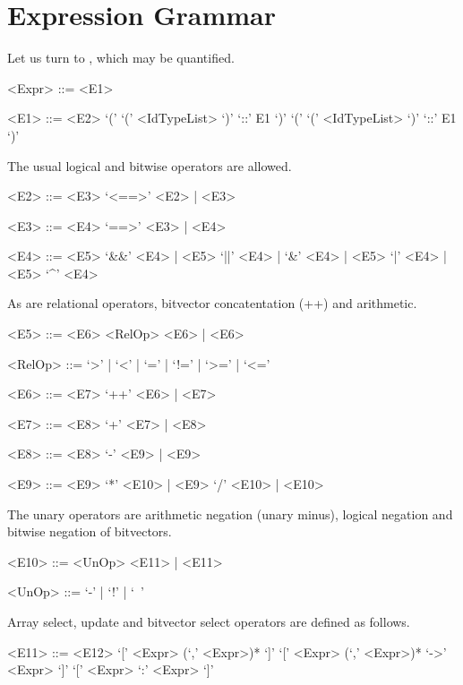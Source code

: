 \section{Expression Grammar}
Let us turn to , which may be quantified. 
\begin{grammar}
    <Expr> ::= <E1>

    <E1> ::= <E2>
         \alt `('  `(' <IdTypeList> `)' `::' E1 `)'
         \alt `('  `(' <IdTypeList> `)' `::' E1 `)'

\end{grammar}

The usual logical and bitwise operators are allowed.
\begin{grammar}
    <E2> ::= <E3> `<==>' <E2> | <E3>

    <E3> ::= <E4> `==>' <E3> | <E4>

    <E4> ::=  <E5> `&&' <E4> | <E5> `||' <E4> | 
          `&' <E4> | <E5> `|' <E4> | <E5> `^' <E4> 
\end{grammar}

As are relational operators, bitvector concatentation (++) and arithmetic.

\begin{grammar}
<E5> ::=  <E6> <RelOp> <E6> | <E6>

<RelOp> ::= `>' | `<' | `=' | `!=' | `>=' | `<='

<E6> ::=  <E7> `++' <E6> | <E7>

<E7> ::=  <E8> `+' <E7> | <E8>

<E8> ::=  <E8> `-' <E9> | <E9>

<E9> ::= <E9> `*' <E10> | <E9> `/' <E10> | <E10>
\end{grammar}

The unary operators are arithmetic negation (unary minus), logical negation and bitwise negation of bitvectors.
\begin{grammar}
    <E10> ::= <UnOp> <E11> | <E11>

    <UnOp> ::= `-' | `!' | `~'
\end{grammar}

Array select, update and bitvector select operators are defined as follows.
\begin{grammar}
    <E11> ::= <E12> `[' <Expr> (`,' <Expr>)* `]'
           `[' <Expr> (`,' <Expr>)* `->' <Expr> `]'
           `[' <Expr> `:' <Expr> `]'
\end{grammar}

